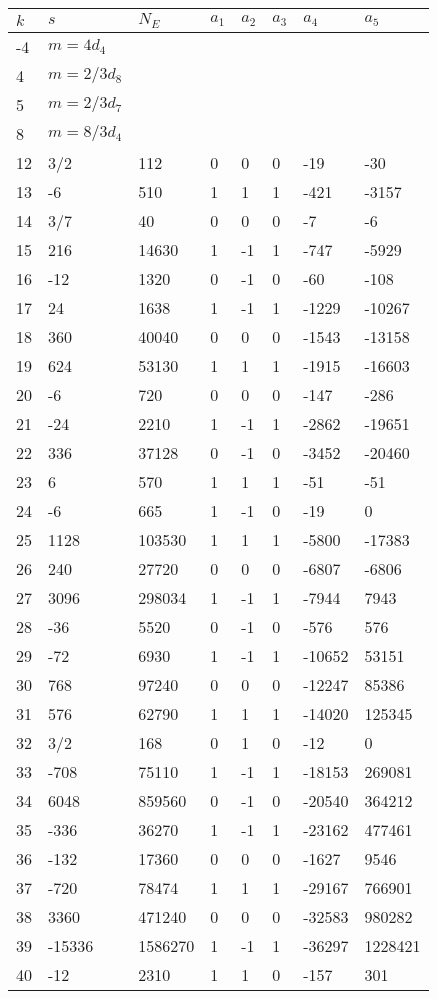 \documentclass{amsart}
\begin{document}
\begin{longtable}{|l|l|l|lllll|}
\hline
$k$ & $s$ & $N_E$ & $a_1$ & $a_2$ & $a_3$ & $a_4$ & $a_5$\\
\hline
-4&$m=4d_{4}$&&\multicolumn{5}{c|}{}\\
4&$m=2/3d_{8}$&&\multicolumn{5}{c|}{}\\
5&$m=2/3d_{7}$&&\multicolumn{5}{c|}{}\\
8&$m=8/3d_{4}$&&\multicolumn{5}{c|}{}\\
12&3/2&112&0&0&0&-19&-30\\
13&-6&510&1&1&1&-421&-3157\\
14&3/7&40&0&0&0&-7&-6\\
15&216&14630&1&-1&1&-747&-5929\\
16&-12&1320&0&-1&0&-60&-108\\
17&24&1638&1&-1&1&-1229&-10267\\
18&360&40040&0&0&0&-1543&-13158\\
19&624&53130&1&1&1&-1915&-16603\\
20&-6&720&0&0&0&-147&-286\\
21&-24&2210&1&-1&1&-2862&-19651\\
22&336&37128&0&-1&0&-3452&-20460\\
23&6&570&1&1&1&-51&-51\\
24&-6&665&1&-1&0&-19&0\\
25&1128&103530&1&1&1&-5800&-17383\\
26&240&27720&0&0&0&-6807&-6806\\
27&3096&298034&1&-1&1&-7944&7943\\
28&-36&5520&0&-1&0&-576&576\\
29&-72&6930&1&-1&1&-10652&53151\\
30&768&97240&0&0&0&-12247&85386\\
31&576&62790&1&1&1&-14020&125345\\
32&3/2&168&0&1&0&-12&0\\
33&-708&75110&1&-1&1&-18153&269081\\
34&6048&859560&0&-1&0&-20540&364212\\
35&-336&36270&1&-1&1&-23162&477461\\
36&-132&17360&0&0&0&-1627&9546\\
37&-720&78474&1&1&1&-29167&766901\\
38&3360&471240&0&0&0&-32583&980282\\
39&-15336&1586270&1&-1&1&-36297&1228421\\
40&-12&2310&1&1&0&-157&301\\

\end{longtable}
\end{document}
